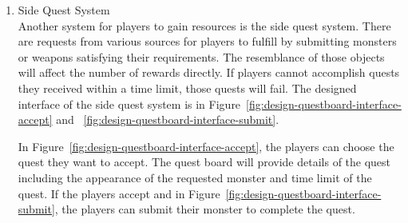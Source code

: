 \documentclass[12pt,oneside,openright,a4paper]{cpe-english-project}
\begin{document}
\begin{itemize}
\begin{enumerate}
	\item Side Quest System \\
	Another system for players to gain resources is the side quest system. There are requests from various sources for players to fulfill by submitting monsters or weapons satisfying their requirements. The resemblance of those objects will affect the number of rewards directly. If players cannot accomplish quests they received within a time limit, those quests will fail. The designed interface of the side quest system is in Figure~\ref{fig:design-questboard-interface-accept} and ~\ref{fig:design-questboard-interface-submit}. \\
	\begin{minipage}[c]{\textwidth}\centering
	\label{fig:design-questboard-interface-accept}
	\end{minipage}
	\begin{minipage}[c]{\textwidth}\centering
	\label{fig:design-questboard-interface-submit}
	\end{minipage}
	In Figure~\ref{fig:design-questboard-interface-accept}, the players can choose the quest they want to accept. The quest board will provide details of the quest including the appearance of the requested monster and time limit of the quest. If the players accept and in Figure~\ref{fig:design-questboard-interface-submit}, the players can submit their monster to complete the quest.


\end{enumerate}
\end{itemize}
\end{document}
